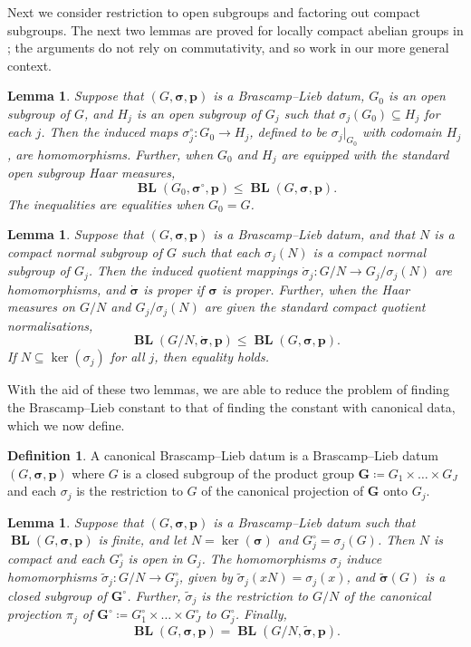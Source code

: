 \documentclass[12pt,twoside,a4paper]{amsart}
\newtheorem{lem}[thm]{Lemma}%
\theoremstyle{definition}
\newtheorem{defn}[thm]{Definition}%
\theoremstyle{remark}
\numberwithin{equation}{section}
\newcommand{\BL}{\operatorname{\mathbf{BL}}}
\newcommand{\bss}{\boldsymbol{\sigma}}
\newcommand{\bsds}{\boldsymbol{\dot\sigma}}
\newcommand{\bsts}{\boldsymbol{\tilde\sigma}}
\newcommand{\bsp}{\boldsymbol{p}}
\newcommand{\bsG}{\boldsymbol{G}}
\newcommand{\bsGc}{\boldsymbol{G^\circ}}
\begin{document}
Next we consider restriction to open subgroups and factoring out compact subgroups.
The next two lemmas are  proved for locally compact abelian groups in \cite{BC25}; the arguments do not rely on commutativity, and so work in our more general context.





\begin{lem}\label{lem:BL-open-sbgp}
Suppose that $(G, \bss,\bsp)$ is a  Brascamp--Lieb datum, $G_0$ is an open subgroup of $G$, and $H_j$ is an open subgroup of $G_j$ such that $\sigma_j(G_0) \subseteq H_j$ for each $j$.
Then the induced maps ${\sigma}^\circ_j\colon  G_0 \to H_j$, defined to be ${\sigma_j}|_{G_0}$ with codomain $H_j$, are homomorphisms. 
Further, when $G_0$ and $H_j$ are equipped with the standard open subgroup Haar measures,
\[
\BL(G_0, \bss^\circ, \bsp)
\leq \BL(G, \bss, \bsp).
\]
The inequalities are equalities when $G_0 = G$.
\end{lem}


\begin{lem}\label{lem:BL-cpct-qtnt}
Suppose that $(G, \bss,\bsp)$ is a Brascamp--Lieb datum, and that $N$ is a compact normal subgroup of $G$ such that each $\sigma_j(N)$ is a compact normal subgroup of $G_j$.
Then the induced quotient mappings $\dot\sigma_j\colon  G/N \to G_j/\sigma_j(N)$ are homomorphisms,
and $\bsds$ is proper if $\bss$ is proper.
Further, when the Haar measures on $G/N$ and $G_j/\sigma_j(N)$ are given the standard compact quotient normalisations,
\[
\BL(G/N, \dot{\bss}, \bsp) \leq \BL(G, \bss, \bsp).
\]
If $N \subseteq \ker(\sigma_j)$ for all $j$, then equality holds.
\end{lem}

With the aid of these two lemmas, we are able to reduce the problem of finding the Brascamp--Lieb constant  to that of finding the constant with canonical data, which we now define.

\begin{defn}%
A canonical Brascamp--Lieb datum is a Brascamp--Lieb datum $(G, \bss,\bsp)$ where $G$ is a closed subgroup of the product group $\bsG \coloneqq G_1\times\dots \times G_J$ and each $\sigma_j$ is the restriction to $G$ of the canonical projection of $\bsG$ onto $G_j$.
\end{defn}



\begin{lem}
Suppose that $(G, \bss, \bsp)$ is a Brascamp--Lieb datum such that $\BL(G, \bss, \bsp)$ is finite, and let $N = \ker(\bss)$ and $G_j^\circ = \sigma_j(G)$.
Then $N$ is compact and each $G_j^\circ$ is open in $G_j$.  
The homomorphisms $\sigma_j$ induce homomorphisms $\tilde\sigma_j\colon  G/N \to G_j^\circ$, given by $\tilde\sigma_j(xN) = \sigma_j(x)$, and $\bsts(G)$ is a closed subgroup of $\bsGc$.
Further, $\tilde\sigma_j$ is the restriction to $G/N$ of the canonical projection $\pi_j$ of $\bsGc \coloneqq  G_1^\circ \times \dots \times G_J^\circ$ to $G_j^\circ$.
Finally, 
\[
\BL(G,\bss,\bsp) = \BL(G/N, \bsts, \bsp).
\]
\end{lem}
\end{document}
